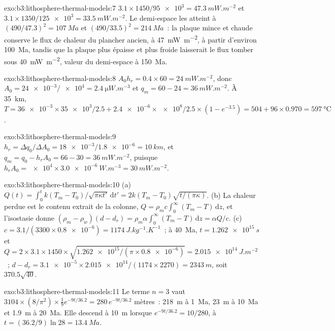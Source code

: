 \begin{solution}{exo:b3:lithosphere-thermal-models:7}
$3.1\times1450/\num{95e3} = \qty{47.3}{mW.m^{-2}}$ et $3.1\times1350/\num{125e3}
= \qty{33.5}{mW.m^{-2}}$. Le demi-espace les atteint à $(490/47.3)^2 =
\qty{107}{Ma}$ et $(490/33.5)^2 = \qty{214}{Ma}$~: la plaque mince et chaude conserve
le flux de chaleur du plancher ancien, à \qty{47}{mW.m^{-2}}, à partir d'environ \qty{100}{Ma},
tandis que la plaque plus épaisse et plus froide laisserait le flux tomber sous
\qty{40}{mW.m^{-2}}, valeur du demi-espace à \qty{150}{Ma}.
\end{solution}

\begin{solution}{exo:b3:lithosphere-thermal-models:8}
$A_0h_r = 0.4\times60 = \qty{24}{mW.m^{-2}}$, donc $A_0 =
\num{24e-3}/\num{e4} = \qty{2.4}{\micro W.m^{-3}}$ et $q_m = 60 - 24 =
\qty{36}{mW.m^{-2}}$. À \qty{35}{km}, $T = \num{36e-3}\times\num{35e3}/2.5 +
\num{2.4e-6}\times\num{e8}/2.5\times(1 - e^{-3.5}) = 504 + 96\times0.970 =
\qty{597}{\celsius}$.
\end{solution}

\begin{solution}{exo:b3:lithosphere-thermal-models:9}
$h_r = \Delta q_0/\Delta A_0 = \num{18e-3}/\num{1.8e-6} = \qty{10}{km}$, et
$q_m = q_0 - h_rA_0 = 66 - 30 = \qty{36}{mW.m^{-2}}$, puisque $h_rA_0 =
\num{e4}\times\qty{3.0e-6}{W.m^{-3}} = \qty{30}{mW.m^{-2}}$.
\end{solution}

\begin{solution}{exo:b3:lithosphere-thermal-models:10}
(a) $Q(t) = \int_0^tk(T_m - T_0)/\sqrt{\pi\kappa t'}\,\mathrm dt' =
2k(T_m - T_0)\sqrt{t/(\pi\kappa)}$. (b) La chaleur perdue est le contenu
extrait de la colonne, $Q = \rho_mc\int_0^\infty(T_m - T)\,\mathrm dz$, et
l'isostasie donne $(\rho_m - \rho_w)(d - d_r) = \rho_m\alpha\int_0^\infty(T_m -
T)\,\mathrm dz = \alpha Q/c$. (c) $c = 3.1/(3300\times\num{0.8e-6}) =
\qty{1174}{J.kg^{-1}.K^{-1}}$~; à \qty{40}{Ma}, $t = \qty{1.262e15}{s}$ et
$Q = 2\times3.1\times1450\times\sqrt{\num{1.262e15}/(\pi\times\num{0.8e-6})} =
\qty{2.015e14}{J.m^{-2}}$~; $d - d_r = \num{3.1e-5}\times\num{2.015e14}/
(1174\times2270) = \qty{2343}{m}$, soit $370.5\sqrt{40}$.
\end{solution}

\begin{solution}{exo:b3:lithosphere-thermal-models:11}
Le terme $n = 3$ vaut $3104\times(8/\pi^2)\times\tfrac19e^{-9t/36.2} =
280\,e^{-9t/36.2}$ mètres~: \qty{218}{m} à \qty{1}{Ma}, \qty{23}{m} à
\qty{10}{Ma} et \qty{1.9}{m} à \qty{20}{Ma}. Elle descend à \qty{10}{m} lorsque
$e^{-9t/36.2} = 10/280$, à $t = (36.2/9)\ln28 = \qty{13.4}{Ma}$.
\end{solution}

